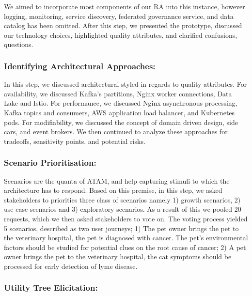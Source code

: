 \documentclass[runningheads]{llncs}
\begin{document}
We aimed to incorporate most components of our RA into this instance, however logging, monitoring, service discovery, federated governance service, and data catalog has been omitted. After this step, we presented the prototype, discussed our technology choices, highlighted quality attributes, and clarified confusions, questions. 

\subsubsection{Identifying Architectural Approaches:}




In this step, we discussed architectural styled in regards to quality attributes. For availability, we discussed Kafka's partitions, Nginx worker connections, Data Lake and Istio.  For performance, we discussed Nginx asynchronous processing, Kafka topics and consumers, AWS application load balancer, and Kubernetes pods. For modifiability, we discussed the concept of domain driven design, side cars, and event brokers. We then continued to analyze these approaches for tradeoffs, sensitivity points, and potential risks. 

\subsubsection{Scenario Prioritisation: }

Scenarios are the quanta of ATAM, and help capturing stimuli to which the architecture has to respond. Based on this premise, in this step, we asked stakeholders to priorities three class of scenarios namely 1) growth scenarios, 2) use-case scenarios and 3) exploratory scenarios. As a result of this we pooled 20 requests, which we then asked stakeholders to vote on. The voting process yielded 5 scenarios, described as two user journeys; 1) The pet owner brings the pet to the veterinary hospital, the pet is diagnosed with cancer. The pet's environmental factors should be studied for potential clues on the root cause of cancer; 2) A pet owner brings the pet to the veterinary hospital, the cat symptoms should be processed for early detection of lyme disease. 

\subsubsection{Utility Tree Elicitation: }
\end{document}
